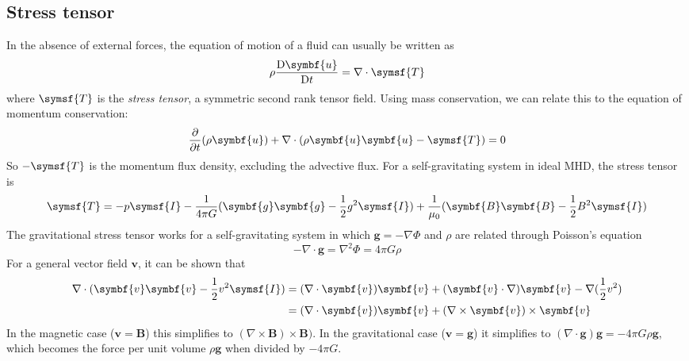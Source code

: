 \documentclass{jknotes}
\newcommand{\B}{\symbf{B}}
\renewcommand{\u}{\symbf{u}}
\begin{document}
\subsection{Stress tensor}
In the absence of external forces, the equation of motion of a fluid can
usually be written as
\begin{equation}
	\rho \frac{\diffD \u}{\diffD t} = \nabla \cdot \symsf{T}
\end{equation}
where $\symsf{T}$  is the \emph{stress tensor}, a symmetric second rank tensor
field. Using mass conservation, we can relate this to the equation of momentum
conservation:
\begin{equation}
	\frac{\partial}{\partial t}(\rho \u) + \nabla \cdot (\rho \u \u -
	\symsf{T}) = 0
\end{equation}
So $-\symsf{T}$ is the momentum flux density, excluding the advective flux.
For a self-gravitating system in ideal MHD, the stress tensor is
\begin{equation}
	\symsf{T} = -p \symsf{I} - \frac{1}{4\pi G}
	(\symbf{g}\symbf{g}-\frac{1}{2}g^2 \symsf{I}) +
	\frac{1}{\mu_0}(\B\B-\frac{1}{2}B^2\symsf{I})
\end{equation}
The gravitational stress tensor works for a self-gravitating system in which
$\symbf{g} = - \nabla \Phi$ and $\rho$ are related through Poisson's equation
\begin{equation}
	-\nabla \cdot \symbf{g} = \nabla^2 \Phi = 4\pi G \rho
\end{equation}
For a general vector field $\symbf{v}$, it can be shown that
\begin{align}
	\nabla \cdot (\symbf{v}\symbf{v}-\frac{1}{2}v^2 \symsf{I}) 
	&= (\nabla \cdot \symbf{v})\symbf{v} + (\symbf{v}\cdot\nabla)\symbf{v} -
	\nabla(\frac{1}{2}v^2) \\
	&= (\nabla \cdot \symbf{v})\symbf{v} + (\nabla \times
	\symbf{v})\times\symbf{v}
\end{align}
In the magnetic case ($\symbf{v} = \B$) this simplifies to $(\nabla \times
\B)\times \B)$. In the gravitational case ($\symbf{v} = \symbf{g}$) it
simplifies to $(\nabla \cdot \symbf{g})\symbf{g} = - 4\pi G \rho \symbf{g}$,
which becomes the force per unit volume $\rho \symbf{g}$ when divided by
$-4\pi G$.
\end{document}
